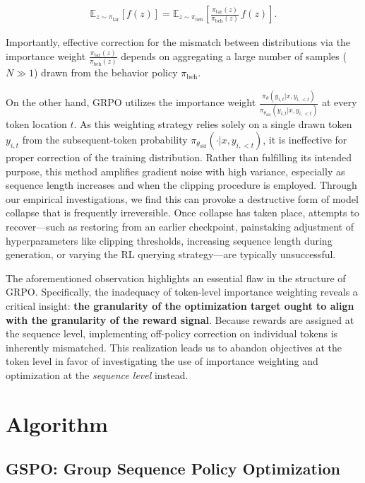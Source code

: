 \begin{align}
\mathbb{E}_{z \sim \pi_\text{tar}} \left[ f(z) \right] = \mathbb{E}_{z \sim \pi_\text{beh}} \left[ \frac{ \pi_\text{tar} (z) }{ \pi_\text{beh} (z)} \, f(z) \right].
\end{align}

Importantly, effective correction for the mismatch between distributions via the importance weight $\frac{ \pi_\text{tar} (z) }{ \pi_\text{beh} (z)}$ depends on aggregating a large number of samples ($N \gg 1$) drawn from the behavior policy $\pi_\text{beh}$.

On the other hand, GRPO utilizes the importance weight $\frac{ \pi_{\theta} (y_{i,t} | x, y_{i,<t}) }{ \pi_{\theta_\text{old}} (y_{i,t} | x,y_{i,<t})}$ at every token location $t$. As this weighting strategy relies solely on a single drawn token $y_{i,t}$ from the subsequent-token probability $\pi_{\theta_\text{old}}( \cdot | x, y_{i, <t})$, it is ineffective for proper correction of the training distribution. Rather than fulfilling its intended purpose, this method amplifies gradient noise with high variance, especially as sequence length increases and when the clipping procedure is employed. Through our empirical investigations, we find this can provoke a destructive form of model collapse that is frequently irreversible. Once collapse has taken place, attempts to recover—such as restoring from an earlier checkpoint, painstaking adjustment of hyperparameters like clipping thresholds, increasing sequence length during generation, or varying the RL querying strategy—are typically unsuccessful.

The aforementioned observation highlights an essential flaw in the structure of GRPO. Specifically, the inadequacy of token-level importance weighting reveals a critical insight: \textbf{the granularity of the optimization target ought to align with the granularity of the reward signal}. Because rewards are assigned at the sequence level, implementing off-policy correction on individual tokens is inherently mismatched. This realization leads us to abandon objectives at the token level in favor of investigating the use of importance weighting and optimization at the \textit{sequence level} instead.

\section{Algorithm}

\subsection{GSPO: Group Sequence Policy Optimization}

